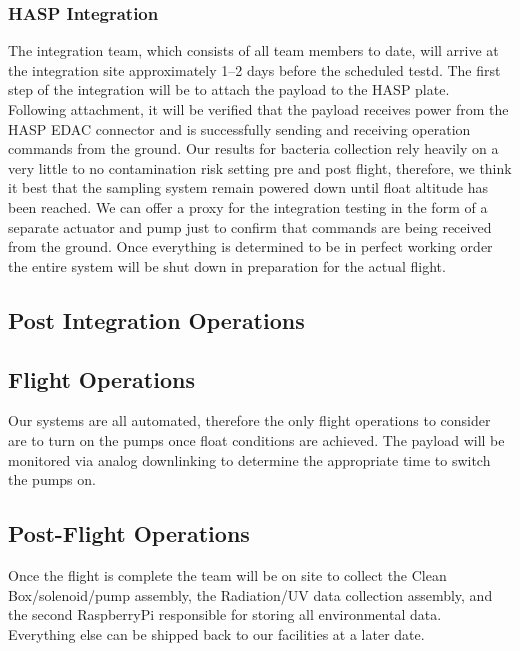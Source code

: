 
\subsubsection{HASP Integration}
The integration team, which consists of all team members to date, will arrive at the integration site approximately \numrange{1}{2} days before the scheduled testd. The first step of the integration will be to attach the payload to the HASP plate. Following attachment, it will be verified that the payload receives power from the HASP EDAC connector and is successfully sending and receiving operation commands from the ground. Our results for bacteria collection rely heavily on a very little to no contamination risk setting pre and post flight, therefore, we think it best that the sampling system remain powered down until float altitude has been reached. We can offer a proxy for the integration testing in the form of a separate actuator and pump just to confirm that commands are being received from the ground. Once everything is determined to be in perfect working order the entire system will be shut down in preparation for the actual flight.

\subsection{Post Integration Operations}

\subsection{Flight Operations}
Our systems are all automated, therefore the only flight operations to consider are to turn on the pumps once float conditions are achieved. The payload will be monitored via analog downlinking to determine the appropriate time to switch the pumps on. 

\subsection{Post-Flight Operations}
Once the flight is complete the team will be on site to collect the Clean Box/solenoid/pump assembly, the Radiation/UV data collection assembly, and the second RaspberryPi responsible for storing all environmental data. Everything else can be shipped back to our facilities at a later date.  



